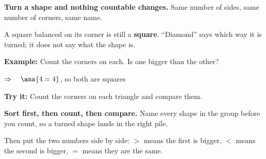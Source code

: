 \documentclass[12pt]{article}
\begin{document}

\begin{formulabox}
\textbf{Turn a shape and nothing countable changes.} Same number of sides, same number of
corners, same name.\par
\smallskip
A square balanced on its corner is still a \textbf{square}. ``Diamond'' says which way it
is turned; it does not say what the shape is.
\end{formulabox}

\begin{examplebox}
\textbf{Example:} \quad Count the corners on each. Is one bigger than the other?
\begin{center}
\end{center}

$\Rightarrow\quad \ans{4 = 4}$, so both are squares
\end{examplebox}

\begin{tryitbox}
\textbf{Try it:} \quad Count the corners on each triangle and compare them.
\begin{center}
\end{center}
\end{tryitbox}


\begin{formulabox}
\textbf{Sort first, then count, then compare.} Name every shape in the group before you
count, so a turned shape lands in the right pile.\par
\smallskip
Then put the two numbers side by side: $>$ means the first is bigger, $<$ means the second
is bigger, $=$ means they are the same.
\end{formulabox}
\end{document}
